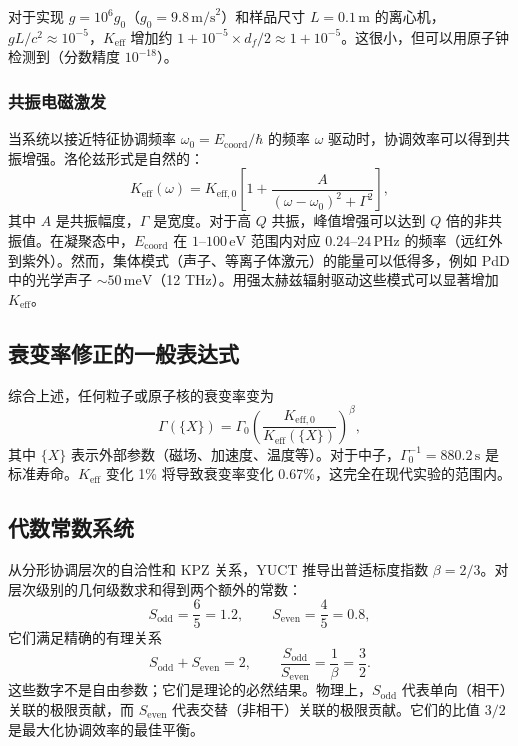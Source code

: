 \documentclass[12pt]{article}
\theoremstyle{remark}
\newcommand{\Keff}{K_{\mathrm{eff}}}
\newcommand{\Keffzero}{K_{\mathrm{eff},0}}
\newcommand{\df}{d_{\!f}}
\newcommand{\Sodd}{S_{\mathrm{odd}}}
\newcommand{\Seven}{S_{\mathrm{even}}}
\begin{document}
	对于实现 \(g = 10^6g_0\)（\(g_0 = 9.8\,\text{m/s}^2\)）和样品尺寸 \(L = 0.1\,\text{m}\) 的离心机，\(gL/c^2 \approx 10^{-5}\)，\(\Keff\) 增加约 \(1 + 10^{-5}\times\df/2 \approx 1 + 10^{-5}\)。这很小，但可以用原子钟检测到（分数精度 \(10^{-18}\)）。
	
	\subsubsection{共振电磁激发}
	
	当系统以接近特征协调频率 \(\omega_0 = E_{\mathrm{coord}}/\hbar\) 的频率 \(\omega\) 驱动时，协调效率可以得到共振增强。洛伦兹形式是自然的：
	\begin{equation}
		\Keff(\omega) = \Keffzero \left[ 1 + \frac{A}{(\omega - \omega_0)^2 + \Gamma^2} \right],
		\label{eq:keff-omega}
	\end{equation}
	其中 \(A\) 是共振幅度，\(\Gamma\) 是宽度。对于高 \(Q\) 共振，峰值增强可以达到 \(Q\) 倍的非共振值。在凝聚态中，\(E_{\mathrm{coord}}\) 在 \(1\)–\(100\,\text{eV}\) 范围内对应 \(0.24\)–\(24\,\text{PHz}\) 的频率（远红外到紫外）。然而，集体模式（声子、等离子体激元）的能量可以低得多，例如 PdD 中的光学声子 \(\sim 50\,\text{meV}\)（12 THz）。用强太赫兹辐射驱动这些模式可以显著增加 \(\Keff\)。
	
	\subsection{衰变率修正的一般表达式}
	
	综合上述，任何粒子或原子核的衰变率变为
	\begin{equation}
		\Gamma(\{X\}) = \Gamma_0 \left( \frac{\Keffzero}{\Keff(\{X\})} \right)^{\beta},
		\label{eq:general-rate}
	\end{equation}
	其中 \(\{X\}\) 表示外部参数（磁场、加速度、温度等）。对于中子，\(\Gamma_0^{-1} = 880.2\,\text{s}\) 是标准寿命。\(\Keff\) 变化 1\% 将导致衰变率变化 0.67\%，这完全在现代实验的范围内。
	
	\subsection{代数常数系统}
	\label{sec:algebraic}
	
	从分形协调层次的自洽性和 KPZ 关系，YUCT 推导出普适标度指数 \(\beta = 2/3\)。对层次级别的几何级数求和得到两个额外的常数：
	\[
	\Sodd = \frac{6}{5}=1.2,\qquad \Seven = \frac{4}{5}=0.8,
	\]
	它们满足精确的有理关系
	\[
	\Sodd + \Seven = 2,\qquad \frac{\Sodd}{\Seven} = \frac{1}{\beta} = \frac{3}{2}.
	\]
	这些数字不是自由参数；它们是理论的必然结果。物理上，\(\Sodd\) 代表单向（相干）关联的极限贡献，而 \(\Seven\) 代表交替（非相干）关联的极限贡献。它们的比值 \(3/2\) 是最大化协调效率的最佳平衡。
	
\end{document}
